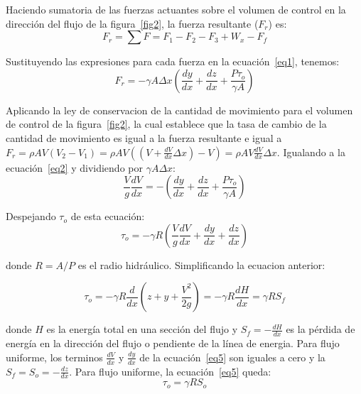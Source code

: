 \documentclass[11pt, oneside]{article}
\begin{document}
Haciendo sumatoria de las fuerzas actuantes sobre el volumen de control en la direcci\'on del flujo de la figura~\ref{fig2}, la fuerza resultante ($F_r$) es:
\begin{equation}
 F_r = \sum F = F_1 - F_2 - F_3 + W_x - F_f 
\label{eq1}
\end{equation}

Sustituyendo las expresiones para cada fuerza en la ecuaci\'on~\ref{eq1}, tenemos:
\begin{equation}
 F_r = -\gamma A \Delta x \left( \frac{dy}{dx} + \frac{dz}{dx} + \frac{P \tau_o}{\gamma A} \right)
\label{eq2}
\end{equation}

Aplicando la ley de conservacion de la cantidad de movimiento para el volumen de control de la figura~\ref{fig2}, la cual establece que la tasa de cambio de la cantidad de movimiento es igual a la fuerza resultante e igual a $F_r = \rho AV (V_2 - V_1) = \rho AV \left( \left( V + \frac{dV}{dx}\Delta x \right) - V \right) = \rho A V \frac{dV}{dx} \Delta x$. Igualando a la ecuaci\'on~\ref{eq2} y dividiendo por $\gamma A \Delta x$:
\begin{equation}
\frac{V}{g}\frac{dV}{dx} = -\left( \frac{dy}{dx} + \frac{dz}{dx} + \frac{P \tau_o}{\gamma A} \right)
\label{eq3}
\end{equation}

Despejando $\tau_o$ de esta ecuaci\'on:
\begin{equation}
\tau_o = -\gamma R \left( \frac{V}{g}\frac{dV}{dx} + \frac{dy}{dx} + \frac{dz}{dx} \right)
\label{eq4}
\end{equation}

donde $R=A/P$ es el radio hidr\'aulico. Simplificando la ecuacion anterior:

\begin{equation}
\tau_o = -\gamma R \frac{d}{dx} \left( z + y + \frac{V^2}{2g} \right) = -\gamma R \frac{dH}{dx} = \gamma R S_f
\label{eq5}
\end{equation}

donde $H$ es la energ\'ia total en una secci\'on del flujo y $S_f = -\frac{dH}{dx}$ es la p\'erdida de energ\'ia en la direcci\'on del flujo o pendiente de la l\'inea de energia. Para flujo uniforme, los terminos  $\frac{dV}{dx}$ y  $\frac{dy}{dx}$ de la ecuaci\'on~\ref{eq5} son iguales a cero y la $S_f = S_o = -\frac{dz}{dx}$. Para flujo uniforme, la ecuaci\'on~\ref{eq5} queda:
\begin{equation}
\tau_o =  \gamma R S_o
\label{eq6}
\end{equation}
\end{document}
